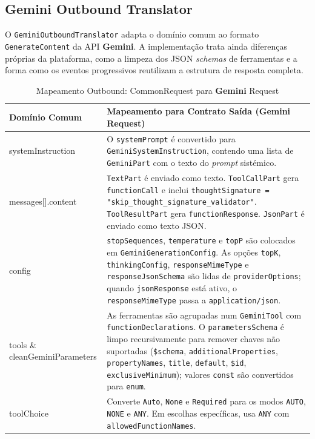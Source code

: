     \subsection{\textbf{Gemini} Outbound Translator}

    O \texttt{GeminiOutboundTranslator} adapta o domínio comum ao formato \texttt{GenerateContent} da API \textbf{Gemini}. A implementação trata ainda diferenças próprias da plataforma, como a limpeza dos JSON \textit{schemas} de ferramentas e a forma como os eventos progressivos reutilizam a estrutura de resposta completa.

    \begin{table}[H]
        \centering
        \footnotesize
        \renewcommand{\arraystretch}{1.25}
        \begin{tabularx}{\textwidth}{|>{\ttfamily\raggedright\arraybackslash}p{4cm}|Y|}
            \hline
            \textbf{Domínio Comum} & \textbf{Mapeamento para Contrato Saída (Gemini Request)} \\
            \hline
            systemInstruction & O \texttt{systemPrompt} é convertido para \texttt{GeminiSystemInstruction}, contendo uma lista de \texttt{GeminiPart} com o texto do \textit{prompt} sistémico. \\
            \hline
            messages[].content & \texttt{TextPart} é enviado como texto. \texttt{ToolCallPart} gera \texttt{functionCall} e inclui \texttt{thoughtSignature = "skip\_thought\_signature\_validator"}. \texttt{ToolResultPart} gera \texttt{functionResponse}. \texttt{JsonPart} é enviado como texto JSON. \\
            \hline
            config & \texttt{stopSequences}, \texttt{temperature} e \texttt{topP} são colocados em \texttt{GeminiGenerationConfig}. As opções \texttt{topK}, \texttt{thinkingConfig}, \texttt{responseMimeType} e \texttt{responseJsonSchema} são lidas de \texttt{providerOptions}; quando \texttt{jsonResponse} está ativo, o \texttt{responseMimeType} passa a \texttt{application/json}. \\
            \hline
            tools \& cleanGeminiParameters & As ferramentas são agrupadas num \texttt{GeminiTool} com \texttt{functionDeclarations}. O \texttt{parametersSchema} é limpo recursivamente para remover chaves não suportadas (\texttt{\$schema}, \texttt{additionalProperties}, \texttt{propertyNames}, \texttt{title}, \texttt{default}, \texttt{\$id}, \texttt{exclusiveMinimum}); valores \texttt{const} são convertidos para \texttt{enum}. \\
            \hline
            toolChoice & Converte \texttt{Auto}, \texttt{None} e \texttt{Required} para os modos \texttt{AUTO}, \texttt{NONE} e \texttt{ANY}. Em escolhas específicas, usa \texttt{ANY} com \texttt{allowedFunctionNames}. \\
            \hline
        \end{tabularx}
        \caption{Mapeamento Outbound: CommonRequest para \textbf{Gemini} Request}
    \end{table}

